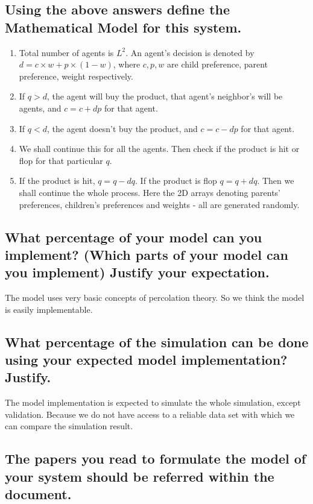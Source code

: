 \documentclass[article, 11pt, a4paper, onesize]{memoir}
\begin{document}
\subsection{Using the above answers define the Mathematical Model for this system.}

\begin{enumerate}
    \item Total number of agents is \(L^2\). An agent's decision is denoted by \(d=c\times
        w+p\times(1-w)\), where \(c,p,w\) are child preference, parent preference, weight
        respectively. 
    \item If \(q>d\), the agent will buy the product, that agent's neighbor's will be
        agents, and \(c=c+dp\) for that agent.
    \item If \(q<d\), the agent doesn't buy the product, and \(c=c-dp\) for that agent. 
    \item We shall continue this for all the agents. Then check if the product is hit or
        flop for that particular \(q\). 
    \item If the product is hit, \(q=q-dq\). If the product is flop \(q=q+dq\). Then we
        shall continue the whole process. Here the 2D arrays denoting parents'
        preferences, children's preferences and weights - all are generated randomly.
\end{enumerate}


\subsection{What percentage of your model can you implement? (Which parts of your model
can you implement) Justify your expectation.}

The model uses very basic concepts of percolation theory. So we think the model is easily
implementable.


\subsection{What percentage of the simulation can be done using your expected model
implementation? Justify.}

The model implementation is expected to simulate the whole simulation, except validation.
Because we do not have access to a reliable data set with which we can compare the
simulation result.


\subsection{The papers you read to formulate the model of your system should be referred
within the document.}
\end{document}
